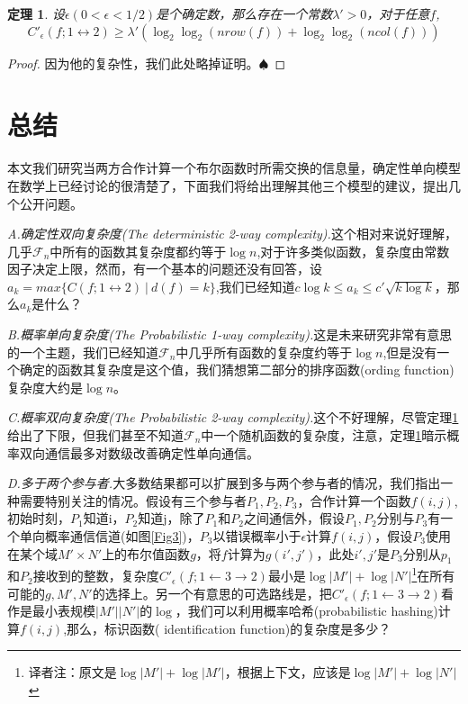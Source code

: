 \documentclass[]{article}
\newtheorem{theorem}{定理}
\newtheorem*{proof}{证明}
\begin{document}
	\begin{theorem}\label{theo5}
		设$\epsilon(0<\epsilon<1/2)$是个确定数，那么存在一个常数$\lambda'>0$，对于任意$f$,
		\[C'_\epsilon (f;1\leftrightarrow 2) \geq \lambda'(\log_2 \log_2(nrow(f))+ \log_2\log_2 (ncol(f)) )\]
    \end{theorem}
	
	\begin{proof}
		因为他的复杂性，我们此处略掉证明。$\spadesuit$
	\end{proof}

	\section{总结}
	本文我们研究当两方合作计算一个布尔函数时所需交换的信息量，确定性单向模型在数学上已经讨论的很清楚了，下面我们将给出理解其他三个模型的建议，提出几个公开问题。\par
	
	\textit{A.确定性双向复杂度(The deterministic 2-way complexity).}这个相对来说好理解，几乎$\mathscr{F}_n$中所有的函数其复杂度都约等于$\log n$,对于许多类似函数，复杂度由常数因子决定上限，然而，有一个基本的问题还没有回答，设$a_k = max\{C(f;1\leftrightarrow 2)\ |\ d(f)=k\}$,我们已经知道$c\log k \leq a_k \leq c'\sqrt{k\log k}$，那么$a_k$是什么？\par
	
	\textit{B.概率单向复杂度(The Probabilistic 1-way complexity).}这是未来研究非常有意思的一个主题，我们已经知道$\mathscr{F}_n$中几乎所有函数的复杂度约等于$\log n$,但是没有一个确定的函数其复杂度是这个值，我们猜想第二部分的排序函数(ording function)复杂度大约是$\log n$。\par
	
	\textit{C.概率双向复杂度(The Probabilistic 2-way complexity).}这个不好理解，尽管定理\ref{theo5}给出了下限，但我们甚至不知道$\mathscr{F}_n$中一个随机函数的复杂度，注意，定理\ref{theo5}暗示概率双向通信最多对数级改善确定性单向通信。\par
	
	\textit{D.多于两个参与者.}大多数结果都可以扩展到多与两个参与者的情况，我们指出一种需要特别关注的情况。假设有三个参与者$P_1,P_2,P_3$，合作计算一个函数$f(i,j)$,初始时刻，$P_1$知道i，$P_2$知道j，除了$P_1$和$P_2$之间通信外，假设$P_1,P_2$分别与$P_3$有一个单向概率通信信道(如图\ref{Fig3})，$P_3$以错误概率小于$\epsilon$计算$f(i,j)$，假设$P_3$使用在某个域$M'\times N'$上的布尔值函数$g$，将$f$计算为$g(i',j')$，此处$i',j'$是$P_3$分别从$p_1$和$P_2$接收到的整数，复杂度$C'_\epsilon(f;1\leftarrow 3 \rightarrow 2)$最小是$\log |M'| + \log |N'|$\footnote{译者注：原文是$\log |M'| + \log |M'|$，根据上下文，应该是$\log |M'| + \log |N'|$}在所有可能的$g,M',N'$的选择上。另一个有意思的可选路线是，把$C'_\epsilon(f;1\leftarrow 3 \rightarrow 2)$看作是最小表规模$|M'| |N'|$的$\log$，我们可以利用概率哈希(probabilistic hashing)计算$f(i,j)$,那么，标识函数( identification function)的复杂度是多少？\par
	
\end{document}

